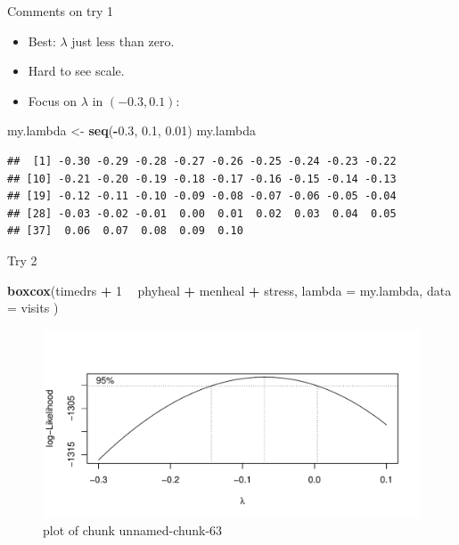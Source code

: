 \documentclass[ignorenonframetext,]{beamer}
\newenvironment{Shaded}{\begin{snugshade}}{\end{snugshade}}
\newcommand{\DataTypeTok}[1]{\textcolor[rgb]{0.13,0.29,0.53}{#1}}
\newcommand{\DecValTok}[1]{\textcolor[rgb]{0.00,0.00,0.81}{#1}}
\newcommand{\FloatTok}[1]{\textcolor[rgb]{0.00,0.00,0.81}{#1}}
\newcommand{\KeywordTok}[1]{\textcolor[rgb]{0.13,0.29,0.53}{\textbf{#1}}}
\newcommand{\NormalTok}[1]{#1}
\newcommand{\OperatorTok}[1]{\textcolor[rgb]{0.81,0.36,0.00}{\textbf{#1}}}
\newcommand{\StringTok}[1]{\textcolor[rgb]{0.31,0.60,0.02}{#1}}
\begin{document}
\begin{frame}[fragile]{Comments on try 1}
\protect\hypertarget{comments-on-try-1}{}

\begin{itemize}
\item
  Best: \(\lambda\) just less than zero.
\item
  Hard to see scale.
\item
  Focus on \(\lambda\) in \((-0.3,0.1)\):
\end{itemize}

\footnotesize

\begin{Shaded}
\begin{Highlighting}[]
\NormalTok{my.lambda <-}\StringTok{ }\KeywordTok{seq}\NormalTok{(}\OperatorTok{-}\FloatTok{0.3}\NormalTok{, }\FloatTok{0.1}\NormalTok{, }\FloatTok{0.01}\NormalTok{)}
\NormalTok{my.lambda}
\end{Highlighting}
\end{Shaded}

\begin{verbatim}
##  [1] -0.30 -0.29 -0.28 -0.27 -0.26 -0.25 -0.24 -0.23 -0.22
## [10] -0.21 -0.20 -0.19 -0.18 -0.17 -0.16 -0.15 -0.14 -0.13
## [19] -0.12 -0.11 -0.10 -0.09 -0.08 -0.07 -0.06 -0.05 -0.04
## [28] -0.03 -0.02 -0.01  0.00  0.01  0.02  0.03  0.04  0.05
## [37]  0.06  0.07  0.08  0.09  0.10
\end{verbatim}

\normalsize

\end{frame}

\begin{frame}[fragile]{Try 2}
\protect\hypertarget{try-2}{}

\begin{Shaded}
\begin{Highlighting}[]
\KeywordTok{boxcox}\NormalTok{(timedrs }\OperatorTok{+}\StringTok{ }\DecValTok{1} \OperatorTok{~}\StringTok{ }\NormalTok{phyheal }\OperatorTok{+}\StringTok{ }\NormalTok{menheal }\OperatorTok{+}\StringTok{ }\NormalTok{stress,}
  \DataTypeTok{lambda =}\NormalTok{ my.lambda,}
  \DataTypeTok{data =}\NormalTok{ visits}
\NormalTok{)}
\end{Highlighting}
\end{Shaded}

\begin{figure}
\centering
\includegraphics{figure/unnamed-chunk-63-1.pdf}
\caption{plot of chunk unnamed-chunk-63}
\end{figure}

\end{frame}
\end{document}
